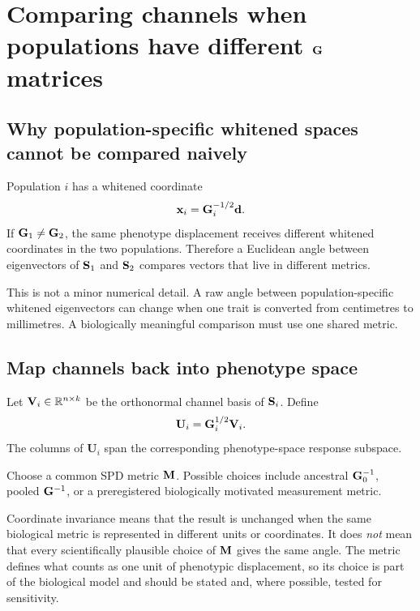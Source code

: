 \chapter{Comparing channels when populations have different \(\mathbf{G}\) matrices}

\section{Why population-specific whitened spaces cannot be compared naively}

Population \(i\) has a whitened coordinate
\begin{equation}
\mathbf x_i=\mathbf{G}_i^{-1/2}\mathbf d.
\end{equation}
If \(\mathbf{G}_1\neq\mathbf{G}_2\), the same phenotype displacement receives different whitened coordinates in the two populations. Therefore a Euclidean angle between eigenvectors of \(\mathbf{S}_1\) and \(\mathbf{S}_2\) compares vectors that live in different metrics.

\begin{cautionbox}
This is not a minor numerical detail. A raw angle between population-specific whitened eigenvectors can change when one trait is converted from centimetres to millimetres. A biologically meaningful comparison must use one shared metric.
\end{cautionbox}

\section{Map channels back into phenotype space}

Let \(\mathbf{V}_i\in\mathbb R^{n\times k}\) be the orthonormal channel basis of \(\mathbf{S}_i\). Define
\begin{equation}
\mathbf U_i=\mathbf{G}_i^{1/2}\mathbf{V}_i.
\label{eq:mapChannelsPhenotype}
\end{equation}
The columns of \(\mathbf U_i\) span the corresponding phenotype-space response subspace.

Choose a common SPD metric \(\mathbf{M}\). Possible choices include ancestral \(\mathbf{G}_0^{-1}\), pooled \(\mathbf{G}^{-1}\), or a preregistered biologically motivated measurement metric.

\begin{cautionbox}
Coordinate invariance means that the result is unchanged when the same biological metric is represented in different units or coordinates. It does \emph{not} mean that every scientifically plausible choice of \(\mathbf{M}\) gives the same angle. The metric defines what counts as one unit of phenotypic displacement, so its choice is part of the biological model and should be stated and, where possible, tested for sensitivity.
\end{cautionbox}

